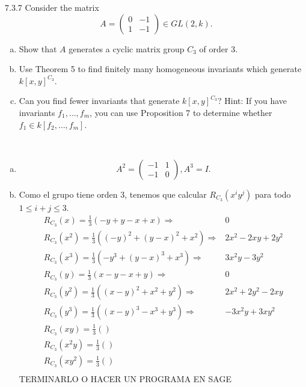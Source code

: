 \documentclass[twoside]{article}
\begin{document}
\begin{ejercicio}{7.3.7}
Consider the matrix
$$A =
\begin{pmatrix}
0 &−1\\
1 &−1
\end{pmatrix}∈ GL(2, k).$$
\begin{enumerate}[a.]
\item Show that $A$ generates a cyclic matrix group $C_3$ of order 3.
\item Use Theorem 5 to find finitely many homogeneous invariants which generate $k[x, y]^{C_3}$.
\item Can you find fewer invariants that generate $k[x, y]^{C_3}$? Hint: If you have invariants
$f_1, \dots , f_m$, you can use Proposition 7 to determine whether $f_1 ∈ k[ f_2, \dots , f_m]$.
\end{enumerate}
\end{ejercicio}
\begin{solucion}\
\begin{enumerate}[a.]
\item 
\[
A^2=\begin{pmatrix}
-1 & 1\\
-1 & 0
\end{pmatrix}, A^3=I.
\]
\item Como el grupo tiene orden 3, tenemos que calcular $R_{C_3}(x^iy^j)$ para todo $1\leq i+j\leq 3$.
\begin{align*}
R_{C_3}(x)=\frac{1}{3}(-y+y-x+x) \Rightarrow  &0\\
R_{C_3}(x^2)=\frac{1}{3}((-y)^2+(y-x)^2+x^2)\Rightarrow & 2x^2-2xy+2y^2\\
R_{C_3}(x^3)=\frac{1}{3}(-y^3+(y-x)^3+x^3)\Rightarrow & 3x^2y-3y^2\\
R_{C_3}(y)=\frac{1}{3}(x-y-x+y)\Rightarrow & 0\\
R_{C_3}(y^2)=\frac{1}{3}((x-y)^2+x^2+y^2)\Rightarrow & 2x^2+2y^2-2xy\\
R_{C_3}(y^3)=\frac{1}{3}((x-y)^3-x^3+y^3)\Rightarrow &-3x^2y+3xy^2\\
R_{C_3}(xy)=\frac{1}{3}()\\
R_{C_3}(x^2y)=\frac{1}{3}()\\
R_{C_3}(xy^2)=\frac{1}{3}()\\
\end{align*}
TERMINARLO O HACER UN PROGRAMA EN SAGE
\end{enumerate}


\end{solucion}
\newpage
\end{document}
